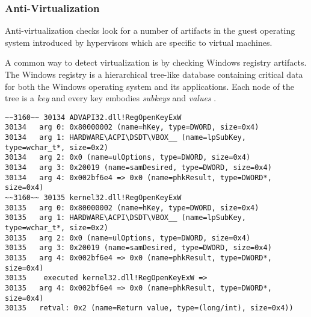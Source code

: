 \subsubsection*{Anti-Virtualization}
Anti-virtualization checks look for a number of artifacts in the guest operating system introduced by hypervisors which are specific to virtual machines.

A common way to detect virtualization is by checking Windows registry artifacts. The Windows registry is a hierarchical tree-like database containing critical data for both the Windows operating system and its applications. Each node of the tree is a \textit{key} and every key embodies \textit{subkeys} and \textit{values} \cite{Regs}. 

\vspace{0.5cm}
\begin{lstlisting}[caption={Log entry relative to \texttt{RegOpenKeyExW} },captionpos=b]
~~3160~~ 30134 ADVAPI32.dll!RegOpenKeyExW
30134 	arg 0: 0x80000002 (name=hKey, type=DWORD, size=0x4)
30134 	arg 1: HARDWARE\ACPI\DSDT\VBOX__ (name=lpSubKey, type=wchar_t*, size=0x2)
30134 	arg 2: 0x0 (name=ulOptions, type=DWORD, size=0x4)
30134 	arg 3: 0x20019 (name=samDesired, type=DWORD, size=0x4)
30134 	arg 4: 0x002bf6e4 => 0x0 (name=phkResult, type=DWORD*, size=0x4)
~~3160~~ 30135 kernel32.dll!RegOpenKeyExW
30135 	arg 0: 0x80000002 (name=hKey, type=DWORD, size=0x4)
30135 	arg 1: HARDWARE\ACPI\DSDT\VBOX__ (name=lpSubKey, type=wchar_t*, size=0x2)
30135 	arg 2: 0x0 (name=ulOptions, type=DWORD, size=0x4)
30135 	arg 3: 0x20019 (name=samDesired, type=DWORD, size=0x4)
30135 	arg 4: 0x002bf6e4 => 0x0 (name=phkResult, type=DWORD*, size=0x4)
30135    executed kernel32.dll!RegOpenKeyExW =>
30135 	arg 4: 0x002bf6e4 => 0x0 (name=phkResult, type=DWORD*, size=0x4)
30135 	retval: 0x2 (name=Return value, type=(long/int), size=0x4))
\end{lstlisting}

